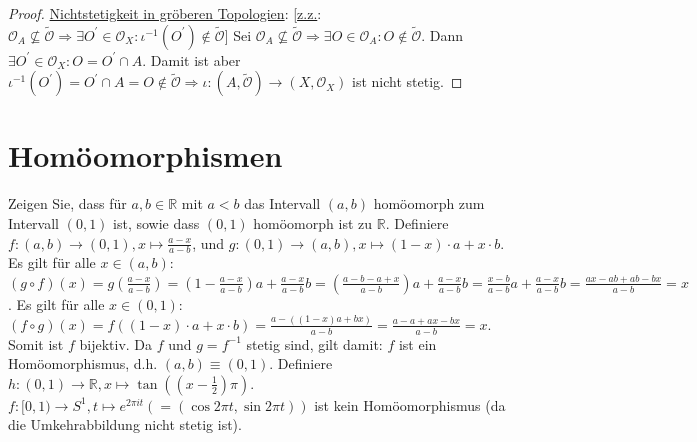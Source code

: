 \documentclass[a4paper,11pt,notitlepage]{report}
\theoremstyle{definition}
\newcommand{\R}{{\ensuremath{\mathbb{R}}}}
\newcommand{\OO}{{\ensuremath{\mathcal{O}}}}
\begin{document}
\begin{proof}
\underline{Nichtstetigkeit in gröberen Topologien}: [\underline{z.z.}: $\OO_A \not\subseteq \tilde \OO \Rightarrow \exists O^\prime \in \OO_X \colon \iota^{-1}(O^\prime) \notin \tilde \OO$]
\newline
Sei $\OO_A \not\subseteq \tilde \OO \Rightarrow \exists O \in \OO_A\colon O \notin \tilde\OO$. Dann  $\exists O^\prime \in \OO_X \colon O = O^\prime \cap A$. Damit ist aber $\iota^{-1}(O^\prime)=O^\prime \cap A = O \notin \tilde\OO \Rightarrow \iota\colon (A,\tilde\OO) \rightarrow (X,\OO_X)$ ist nicht stetig.
\end{proof}

\section{Homöomorphismen}
Zeigen Sie, dass für $a,b \in \R$ mit $a < b$ das Intervall $(a,b)$ homöomorph zum Intervall $(0,1)$ ist, sowie dass $(0,1)$ homöomorph ist zu $\R$.
\newline
Definiere $f \colon (a,b) \rightarrow (0,1), x \mapsto \frac{a-x}{a-b}$, und $g \colon (0,1) \rightarrow (a,b), x \mapsto (1-x) \cdot a + x \cdot b$.
\newline
Es gilt für alle $x \in (a,b)$:
\newline
$(g \circ f)(x) = g \left(\frac{a-x}{a-b}\right) = \left(1- \frac{a-x}{a-b}\right)a + \frac{a-x}{a-b}b = \left(\frac{a-b-a+x}{a-b}\right)a+ \frac{a-x}{a-b}b = \frac{x-b}{a-b}a + \frac{a-x}{a-b}b = \frac{ax-ab+ab-bx}{a-b} = x$.
\newline
Es gilt für alle $x \in (0,1)$:
\newline
$(f \circ g)(x)=f\left((1-x) \cdot a + x \cdot b\right)=\frac{a-((1-x)a+bx)}{a-b}=\frac{a-a+ax-bx}{a-b}=x$. Somit ist $f$ bijektiv. 
Da $f$ und $g = f^{-1}$ stetig sind, gilt damit: $f$ ist ein Homöomorphismus, d.h. $(a,b) \equiv (0,1)$.
\newline
Definiere $h \colon (0,1) \rightarrow \R, x \mapsto \tan{\left((x-\frac{1}{2})\pi \right)}$.
\newline
\newline
$f \colon [0,1) \rightarrow S^1, t \mapsto e^{2\pi i t} \left(=(\cos{2 \pi t}, \sin{2 \pi t})\right)$ ist kein Homöomorphismus (da die Umkehrabbildung nicht stetig ist).
\end{document}
